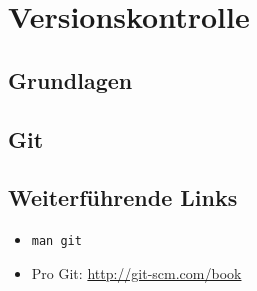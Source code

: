 \chapter{Versionskontrolle}
\section{Grundlagen}
\section{Git}
\section{Weiterführende Links}
\begin{itemize}
  \item \texttt{man git}
  \item Pro Git: \href{http://git-scm.com/book}{http://git-scm.com/book}
\end{itemize}
